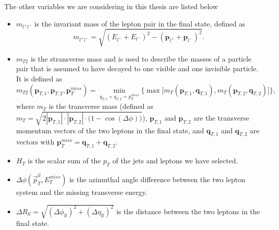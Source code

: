 The other variables we are considering in this thesis are listed below

\begin{itemize}
    \item $m_{l^+l^-}$ is the invariant mass of the lepton pair in the final state, defined as 
            \begin{equation}
                m_{l^+l^-} = \sqrt{(E_{l^+} + E_{l^-})^2 - (\mathbf{p}_{l^+} + \mathbf{p}_{l^-})^2}.
            \end{equation}
    \item $m_{T2}$ is the stransverse mass \cite{sleptonexclusion} and is used to describe the masses of a particle pair that is assumed to have decayed to one visible and one invisible particle. It is defined as 
    \begin{equation*}
        m_{T2}(\mathbf{p}_{T,1}, \mathbf{p}_{T,2}, \mathbf{p}_{T}^{miss}) = \min_{q_{T,1} + q_{T,2} = p_T^{miss}} \bigg\{\max\big[m_T(\mathbf{p}_{T,1}, \mathbf{q}_{T,1}), m_T(\mathbf{p}_{T,2}, \mathbf{q}_{T,2})\big]\bigg\},
    \end{equation*}
    where $m_T$ is the transverse mass (defined as $m_T = \sqrt{2 |\mathbf{p}_{T,1}| \cdot |\mathbf{p}_{T,2}| \cdot \big(1-\cos(\Delta\phi)\big)}$), $\mathbf{p}_{T,1}$ and $\mathbf{p}_{T,2}$ are the transverse momentum vectors of the two leptons in the final state, and $\mathbf{q}_{T,1}$ and $\mathbf{q}_{T,2}$ are vectors with $\mathbf{p}_{T}^{miss} = \mathbf{q}_{T,1} + \mathbf{q}_{T,2}$. 
    \item  $H_T$ is the scalar sum of the $p_T$ of the jets and leptons we have selected.
    \item  $\Delta \phi (\Vec{p}_T^{ll}, E_T^{miss})$ is the azimuthal angle difference between the two lepton system and the missing transverse energy.
    \item $\Delta R_{ll} = \sqrt{(\Delta\phi_{ll})^2 + (\Delta \eta_{ll})^2}$ is the distance between the two leptons in the final state.
\end{itemize}


   
  
    







